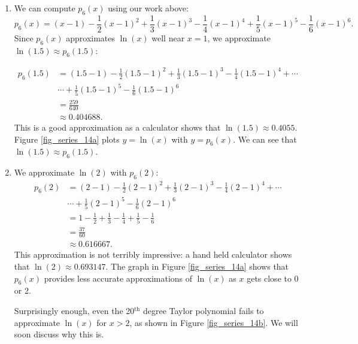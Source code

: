 \begin{example}
\begin{enumerate}
\item		We can compute $p_6(x)$ using our work above:
$$p_6(x) = (x-1)-\frac12(x-1)^2+\frac13(x-1)^3-\frac14(x-1)^4+\frac15(x-1)^5-\frac16(x-1)^6.$$
Since $p_6(x)$ approximates $\ln(x)$ well near $x=1$, we approximate $\ln(1.5) \approx p_6(1.5)$:

\vspace{-0.5cm}

\begin{align*}
p_6(1.5) &= (1.5-1)-\frac12(1.5-1)^2+\frac13(1.5-1)^3-\frac14(1.5-1)^4+\cdots \\
			&\cdots +\frac15(1.5-1)^5-\frac16(1.5-1)^6\\[0.2cm]
	&=\frac{259}{640}\\[0.2cm]
	&\approx 0.404688.
\end{align*}
\normalsize
This is a good approximation as a calculator shows that $\ln(1.5) \approx 0.4055.$ Figure \ref{fig_series_14a} plots $y=\ln(x)$ with $y=p_6(x)$. We can see that $\ln(1.5)\approx p_6(1.5)$.

\item	
We approximate $\ln(2)$ with $ p_6(2)$:
\begin{align*}
p_6(2) &= (2-1)-\frac12(2-1)^2+\frac13(2-1)^3-\frac14(2-1)^4+\cdots \\
			&\cdots +\frac15(2-1)^5-\frac16(2-1)^6\\
			&=	1-\frac12+\frac13-\frac14+\frac15-\frac16 \\
			&= \frac{37}{60}\\ 
			&\approx 0.616667.
\end{align*}
This approximation is not terribly impressive: a hand held calculator shows that $\ln(2) \approx 0.693147.$ The graph in Figure \ref{fig_series_14a} shows that $p_6(x)$ provides less accurate approximations of $\ln(x)$ as $x$ gets close to 0 or 2. 

Surprisingly enough, even the 20$^\text{th}$ degree Taylor polynomial fails to approximate $\ln(x)$ for $x>2$, as shown in Figure \ref{fig_series_14b}. We will soon discuss why this is.

\end{enumerate}


\end{example}
